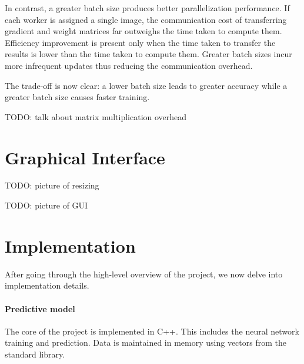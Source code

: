 \documentclass[a4paper]{article}
\begin{document}
In contrast, a greater batch size produces better parallelization performance. If each worker is assigned a single image, the communication cost of transferring gradient and weight matrices far outweighs the time taken to compute them. Efficiency improvement is present only when the time taken to transfer the results is lower than the time taken to compute them. Greater batch sizes incur more infrequent updates thus reducing the communication overhead.

The trade-off is now clear: a lower batch size leads to greater accuracy while a greater batch size causes faster training.

TODO: talk about matrix multiplication overhead


\begin{center}
\end{center}



\newpage
\section{Graphical Interface}
TODO: picture of resizing

TODO: picture of GUI



\newpage
\section{Implementation}
After going through the high-level overview of the project, we now delve into implementation details.

\paragraph{Predictive model} The core of the project is implemented in C++. This includes the neural network training and prediction. Data is maintained in memory using vectors from the standard library.
\end{document}
